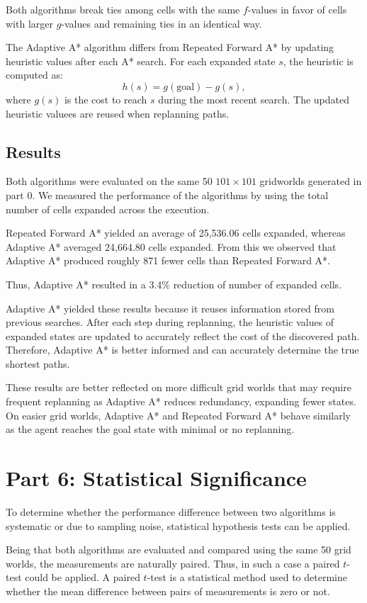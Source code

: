 \documentclass{article}
\begin{document}
Both algorithms break ties among cells with the same $f$-values in favor of cells with larger $g$-values and remaining ties in an identical way. 

The Adaptive A* algorithm differs from Repeated Forward A* by updating heuristic values after each A* search. For each expanded state $s$, the heuristic is computed as:
\[
h(s) = g(\text{goal}) - g(s),
\]
where $g(s)$ is the cost to reach $s$ during the most recent search. The updated heuristic valuees are reused when replanning paths.

\subsection{Results}
Both algorithms were evaluated on the same 50 $101 \times 101$ gridworlds generated in part 0. We measured the performance of the algorithms by using the total number of cells expanded across the execution.

Repeated Forward A* yielded an average of 25,536.06 cells expanded, whereas Adaptive A* averaged 24,664.80 cells expanded. From this we observed that Adaptive A* produced roughly 871 fewer cells than Repeated Forward A*.

Thus, Adaptive A* resulted in a 3.4\% reduction of number of expanded cells.

Adaptive A* yielded these results because it reuses information stored from previous searches. After each step during replanning, the heuristic values of expanded states are updated to accurately reflect the cost of the discovered path. Therefore, Adaptive A* is better informed and can accurately determine the true shortest paths.

These results are better reflected on more difficult grid worlds that may require frequent replanning as Adaptive A* reduces redundancy, expanding fewer states. On easier grid worlds, Adaptive A* and Repeated Forward A* behave similarly as the agent reaches the goal state with minimal or no replanning.

\section{Part 6: Statistical Significance}

To determine whether the performance difference between two algorithms is systematic or due to sampling noise, statistical hypothesis tests can be applied. 

Being that both algorithms are evaluated and compared using the same 50 grid worlds, the measurements are naturally paired. Thus, in such a case a paired $t$-test could be applied. A paired $t$-test is a statistical method used to determine whether the mean difference between pairs of measurements is zero or not. 
\end{document}

